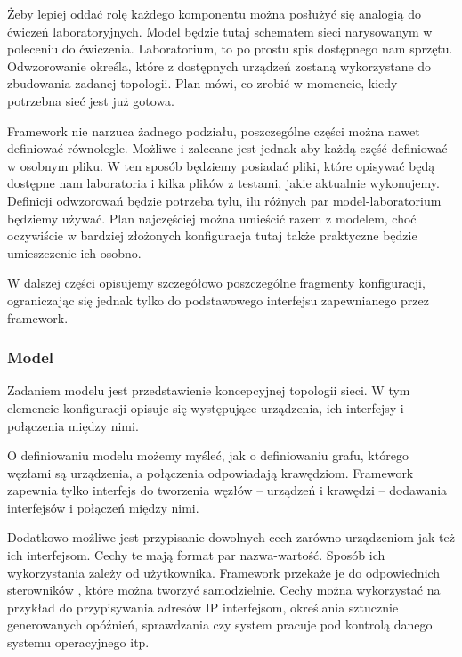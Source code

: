 \documentclass[00-praca-magisterska.tex]{subfiles}
\begin{document}
Żeby lepiej oddać rolę każdego komponentu można posłużyć się analogią do
ćwiczeń laboratoryjnych. Model będzie tutaj schematem sieci narysowanym w
poleceniu do ćwiczenia. Laboratorium, to po prostu spis dostępnego nam
sprzętu. Odwzorowanie określa, które z dostępnych urządzeń zostaną wykorzystane
do zbudowania zadanej topologii. Plan mówi, co zrobić w momencie, kiedy
potrzebna sieć jest już gotowa.

Framework nie narzuca żadnego podziału, poszczególne części można nawet
definiować równolegle. Możliwe i zalecane jest jednak aby każdą część
definiować w osobnym pliku. W ten sposób będziemy posiadać pliki,
które opisywać będą dostępne nam laboratoria i kilka plików z testami, jakie
aktualnie wykonujemy. Definicji odwzorowań będzie potrzeba tylu, ilu różnych
par model-laboratorium będziemy używać. Plan najczęściej można umieścić razem z
modelem, choć oczywiście w bardziej złożonych konfiguracja tutaj także
praktyczne będzie umieszczenie ich osobno.

W dalszej części opisujemy szczegółowo poszczególne fragmenty konfiguracji,
ograniczając się jednak tylko do podstawowego interfejsu zapewnianego przez
framework. 

\label{arete-master-config-model}
\subsubsection{Model}

Zadaniem modelu jest przedstawienie koncepcyjnej topologii sieci. W tym
elemencie konfiguracji opisuje się występujące urządzenia, ich interfejsy i
połączenia między nimi.

O definiowaniu modelu możemy myśleć, jak o definiowaniu grafu, którego węzłami
są urządzenia, a połączenia odpowiadają krawędziom. Framework zapewnia tylko
interfejs do tworzenia węzłów -- urządzeń i krawędzi -- dodawania interfejsów
i połączeń między nimi.

Dodatkowo możliwe jest przypisanie dowolnych cech zarówno urządzeniom jak też
ich interfejsom. Cechy te mają format par nazwa-wartość. Sposób ich
wykorzystania zależy od użytkownika. Framework przekaże je do odpowiednich
sterowników , które można
tworzyć samodzielnie. Cechy można wykorzystać na przykład do przypisywania
adresów IP interfejsom, określania sztucznie generowanych opóźnień,
sprawdzania czy system pracuje pod kontrolą danego systemu operacyjnego itp.
\end{document}
